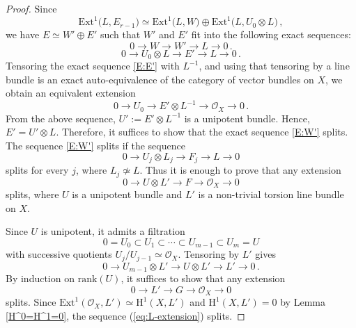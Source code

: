 \documentclass[12pt, reqno]{amsart}
\theoremstyle{plain}
\numberwithin{equation}{section}
\begin{document}
\begin{proof}
	
	Since 
	$$\mathrm{Ext}^1 \bigl( L, E_{r-1} \bigr) \simeq \mathrm{Ext}^1 \bigl( L, W \bigr) \oplus \mathrm{Ext}^1 \bigl( L, U_0 \otimes L \bigr)\,,$$
	we have $E \simeq W' \oplus E'$ such that $W'$ and $E'$ fit into the following exact sequences: 
	\begin{equation}\label{E:W'}
		0\longrightarrow W \longrightarrow W' \longrightarrow L \longrightarrow 0 \,.
	\end{equation}
	\begin{equation}\label{E:E'}
		0\longrightarrow U_0 \otimes L \longrightarrow E' \longrightarrow L \longrightarrow 0 \,.
	\end{equation}
	Tensoring the exact sequence \eqref{E:E'} with \(L^{-1}\), and using that tensoring by a line bundle is an exact auto-equivalence of the category of vector bundles on \(X\), we obtain an equivalent extension
	\begin{equation}\label{eq:quence}
		0 \longrightarrow U_0 \longrightarrow E'\otimes L^{-1} \longrightarrow \mathcal{O}_X \longrightarrow 0 \,.
	\end{equation}
	From the above sequence, $U':=E'\otimes L^{-1}$ is a unipotent bundle. Hence, $E'=U' \otimes L$. Therefore, it suffices to show that the exact sequence \eqref{E:W'} splits. The sequence \eqref{E:W'} splits if the sequence 
	$$0 \longrightarrow U_j \otimes L_j \longrightarrow F_j \longrightarrow L \longrightarrow 0 $$
	splits for every $j$, where $L_j \not \simeq L$. Thus it is enough to prove that any extension
	\begin{equation}\label{eq:Ui-extension}
		0 \longrightarrow U \otimes L' \longrightarrow F \longrightarrow \mathcal{O}_X \longrightarrow 0
	\end{equation}
	splits, where \(U\) is a unipotent bundle and \(L'\) is a non-trivial torsion line bundle on \(X\).
	
	Since \(U\) is unipotent, it admits a filtration
	\[
	0 = U_0 \subset U_1 \subset \cdots \subset U_{m-1} \subset U_m = U
	\]
	with successive quotients \(U_j/U_{j-1} \simeq \mathcal{O}_X\). Tensoring by \(L'\) gives
	\[
	0 \longrightarrow U_{m-1}\otimes L' \longrightarrow U \otimes L' \longrightarrow L' \longrightarrow 0 \,.
	\]
	By induction on \(\mathrm{rank}(U)\), it suffices to show that any extension
	\begin{equation}\label{eq:L-extension}
		0 \longrightarrow L' \longrightarrow G \longrightarrow \mathcal{O}_X \longrightarrow 0
	\end{equation}
	splits. Since $\mathrm{Ext}^1(\mathcal{O}_X, L') \simeq \mathrm{H}^1(X, L')$ and $\mathrm{H}^1(X, L')=0$ by Lemma \ref{H^0=H^1=0}, the sequence (\ref{eq:L-extension}) splits.
\end{proof}
\end{document}
